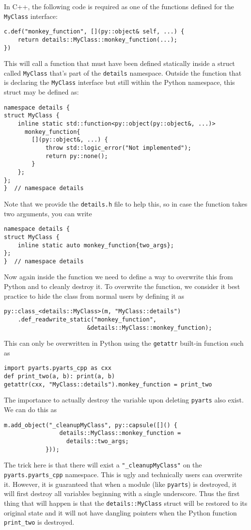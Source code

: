 In C++, the following code is required as one of the functions defined for the \texttt{MyClass} interface:
\begin{verbatim}
c.def("monkey_function", [](py::object& self, ...) {
    return details::MyClass::monkey_function(...);
})
\end{verbatim}
This will call a function that must have been defined statically inside a struct called \texttt{MyClass} that's part of the \texttt{details} namespace.
Outside the function that is declaring the \texttt{MyClass} interface but still within the Python namespace, this struct may be defined as:
\begin{verbatim}
namespace details {
struct MyClass {
    inline static std::function<py::object(py::object&, ...)>
      monkey_function{
        [](py::object&, ...) {
            throw std::logic_error("Not implemented");
            return py::none();
        }
    };
};
}  // namespace details
\end{verbatim}
Note that we provide the \verb|details.h| file to help this, so in case the function takes two arguments, you can write
\begin{verbatim}
namespace details {
struct MyClass {
    inline static auto monkey_function{two_args};
};
}  // namespace details
\end{verbatim}
Now again inside the function we need to define a way to overwrite this from Python and to cleanly destroy it.
To overwrite the function, we consider it best practice to hide the class from normal users by defining it as
\begin{verbatim}
py::class_<details::MyClass>(m, "MyClass::details")
    .def_readwrite_static("monkey_function",
                        &details::MyClass::monkey_function);
\end{verbatim}
This can only be overwritten in Python using the \texttt{getattr} built-in function such as
\begin{verbatim}
import pyarts.pyarts_cpp as cxx
def print_two(a, b): print(a, b)
getattr(cxx, "MyClass::details").monkey_function = print_two
\end{verbatim}
The importance to actually destroy the variable upon deleting \texttt{pyarts} also exist.  We can do this as
\begin{verbatim}
m.add_object("_cleanupMyClass", py::capsule([]() {
                details::MyClass::monkey_function =
                  details::two_args;
            }));
\end{verbatim}
The trick here is that there will exist a \texttt{"_cleanupMyClass"} on the \texttt{pyarts.pyarts_cpp} namespace.
This is ugly and technically users can overwrite it.  However, it is guaranteed that when a module (like \texttt{pyarts})
is destroyed, it will first destroy all variables beginning with a single underscore.  Thus the first thing that will
happen is that the \texttt{details::MyClass} struct will be restored to its original state and it will not have dangling
pointers when the Python function \texttt{print_two} is destroyed.

